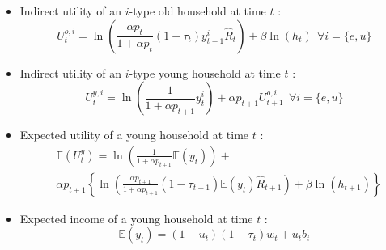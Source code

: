 \documentclass{beamer}
\begin{document}
		\begin{frame}[label = indexputility]
			\begin{itemize}
				\item Indirect utility of an $i$-type old household at time $t$ :
				\begin{equation*}
				U_t^{o,i} = \ln\left(\frac{\alpha p_t}{1+\alpha p_t}(1-\tau_t)y_{t-1}^i\hat{R}_t\right) + \beta \ln(h_t) ~~ \forall i = \lbrace e,u \rbrace
				\end{equation*}
				\item Indirect utility of an $i$-type young household at time $t$ :
				\begin{equation*}
				U_t^{y,i} = \ln\left(\frac{1}{1+\alpha p_{t+1}}y_t^i\right)+ \alpha p_{t+1} U_{t+1}^{o,i} ~~ \forall i = \lbrace e,u \rbrace
				\end{equation*}
				\item Expected utility of a young household at time $t$ :
				\begin{align*}
				&\mathbb{E}({U}_t^y) = \ln\left(\frac{1}{1+\alpha p_{t+1}}\mathbb{E}\left(y_t\right)\right) +\\
				&\alpha p_{t+1}\left\lbrace \ln\left(\frac{\alpha p_{t+1}}{1+\alpha p_{t+1}}(1-\tau_{t+1})\mathbb{E}(y_t)\hat{R}_{t+1}\right) + \beta \ln(h_{t+1}) \right\rbrace
				\end{align*}
				\item Expected income of a young household at time $t$ :
				\begin{equation*}
					\mathbb{E}(y_t) = (1-u_t)(1-\tau_t)w_t + u_tb_t
				\end{equation*}			
			\end{itemize}
			\hyperlink{utilityresult<1>}{}
		\end{frame}
\end{document}
